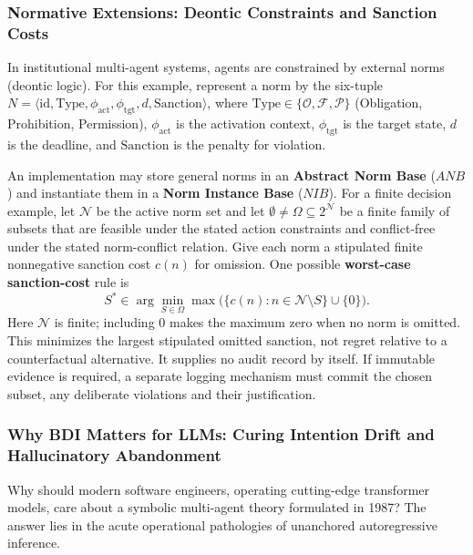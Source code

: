 \documentclass[11pt,a4paper]{article}
\begin{document}
\subsubsection{Normative Extensions: Deontic Constraints and Sanction Costs}

In institutional multi-agent systems, agents are constrained by external norms (deontic logic). For this example, represent a norm by the six-tuple $N = \langle \mathrm{id}, \mathrm{Type}, \phi_{\text{act}}, \phi_{\text{tgt}}, d, \mathrm{Sanction} \rangle$, where $\mathrm{Type} \in \{\mathcal{O}, \mathcal{F}, \mathcal{P}\}$ (Obligation, Prohibition, Permission), $\phi_{\text{act}}$ is the activation context, $\phi_{\text{tgt}}$ is the target state, $d$ is the deadline, and $\mathrm{Sanction}$ is the penalty for violation.

An implementation may store general norms in an \textbf{Abstract Norm Base}
($ANB$) and instantiate them in a \textbf{Norm Instance Base} ($NIB$).
For a finite decision example, let $\mathcal N$ be the active norm set and let
$\emptyset\ne\Omega\subseteq 2^{\mathcal N}$ be a finite family of subsets that
are feasible under the stated action constraints and conflict-free under the
stated norm-conflict relation. Give each norm a stipulated finite nonnegative
sanction cost $c(n)$ for omission. One possible \textbf{worst-case sanction-cost}
rule is
\begin{equation}
S^*\in\arg\min_{S\in\Omega}
\max\bigl(\{c(n):n\in\mathcal N\setminus S\}\cup\{0\}\bigr).
\end{equation}
Here $\mathcal N$ is finite; including $0$ makes the maximum zero when no norm
is omitted. This minimizes the largest stipulated omitted sanction, not regret
relative to a counterfactual alternative. It supplies no audit record by itself.
If immutable evidence is required, a separate logging mechanism must commit the
chosen subset, any deliberate violations and their justification.

\subsubsection{Why BDI Matters for LLMs: Curing Intention Drift and Hallucinatory Abandonment}
\label{sec:why-bdi-matters}

Why should modern software engineers, operating cutting-edge transformer models, care about a symbolic multi-agent theory formulated in 1987? The answer lies in the acute operational pathologies of unanchored autoregressive inference.
\end{document}
